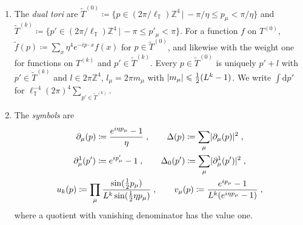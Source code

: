 \documentclass[11pt]{preprint}
\newcommand{\dd}{\mathrm{d}}
\DeclarePairedDelimiter{\abs}{\lvert}{\rvert}
\numberwithin{equation}{section}
\begin{document}
\begin{definition}\label{def:symbols}
\begin{enumerate}[label=(\roman*)]
\item The \emph{dual tori} are $\tilde T^{(0)} \coloneqq \{ p \in (2\pi/\ell_{\mathbb T})\mathbb Z^4 \,|\, -\pi/\eta \leqslant p_\mu < \pi/\eta \}$ and $\tilde T^{(k)} \coloneqq \{ p' \in (2\pi/\ell_{\mathbb T})\mathbb Z^4 \,|\, -\pi \leqslant p'_\mu < \pi \}$. For a function $f$ on $T^{(0)}$, $\tilde f(p) \coloneqq \sum_x\eta^4e^{-ip \cdot x}f(x)$ for $p \in \tilde T^{(0)}$, and likewise with the weight one for functions on $T^{(k)}$ and $p' \in \tilde T^{(k)}$. Every $p \in \tilde T^{(0)}$ is uniquely $p' + l$ with $p' \in \tilde T^{(k)}$ and $l \in 2\pi\mathbb Z^4$, $l_\mu = 2\pi m_\mu$ with $\abs{m_\mu} \leqslant \frac{1}{2}(L^k - 1)$. We write $\int\dd p'$ for $\ell_{\mathbb T}^{-4}(2\pi)^4\sum_{p' \in \tilde T^{(k)}}$.
\item The \emph{symbols} are
\begin{gather*}
    \partial_\mu(p) \coloneqq \frac{e^{i\eta p_\mu} - 1}{\eta}\;,
    \qquad
    \Delta(p) \coloneqq \sum_\mu\abs{\partial_\mu(p)}^2\;,\\
    \partial^1_\mu(p') \coloneqq e^{ip'_\mu} - 1\;,
    \qquad
    \Delta_0(p') \coloneqq \sum_\mu\abs{\partial^1_\mu(p')}^2\;,\\
    u_k(p) \coloneqq \prod_\mu\frac{\sin(\frac{1}{2}p_\mu)}{L^k\sin(\frac{1}{2}\eta p_\mu)}\;,
    \qquad
    v_\mu(p) \coloneqq \frac{e^{ip_\mu} - 1}{L^k(e^{i\eta p_\mu} - 1)}\;,
\end{gather*}
where a quotient with vanishing denominator has the value one.
\end{enumerate}
\end{definition}
\end{document}
